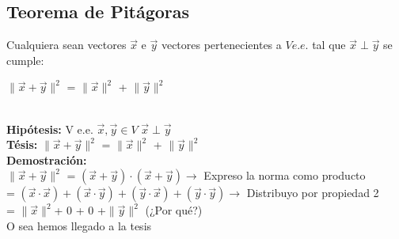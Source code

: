 \documentclass[11pt]{article}
\begin{document}
\subsection{Teorema de Pitágoras}
Cualquiera sean vectores $\vec{x}$ e $\vec{y}$ vectores pertenecientes a $V e.e.$ tal que $\vec{x}\perp\vec{y}$ se cumple: \\
\centerline {$\parallel\vec{x}+\vec{y}\parallel^2$ = $\parallel\vec{x}\parallel^2$ + $\parallel\vec{y}\parallel^2$}\\
\textbf{Hipótesis:} V e.e. $\vec{x}, \vec{y} \in V$ $\vec{x}\perp\vec{y}$\\
\textbf{Tésis:} $\parallel\vec{x}+\vec{y}\parallel^2$ = $\parallel\vec{x}\parallel^2$ + $\parallel\vec{y}\parallel^2$ \\
\textbf {Demostración:}\\
$\parallel\vec{x}+\vec{y}\parallel^2$ = $(\vec{x} + \vec{y})\cdot(\vec{x} + \vec{y}) \rightarrow$ Expreso la norma como producto \\ 
 = $(\vec{x}\cdot\vec{x}) + (\vec{x}\cdot\vec{y}) + (\vec{y}\cdot\vec{x})+ (\vec{y}\cdot\vec{y}) \rightarrow$ Distribuyo por propiedad 2 \\
 = $\parallel\vec{x}\parallel^2$+  0  +  0  +$\parallel\vec{y}\parallel^2$ (¿Por qué?) \\
O sea hemos llegado a la tesis
\end{document}
